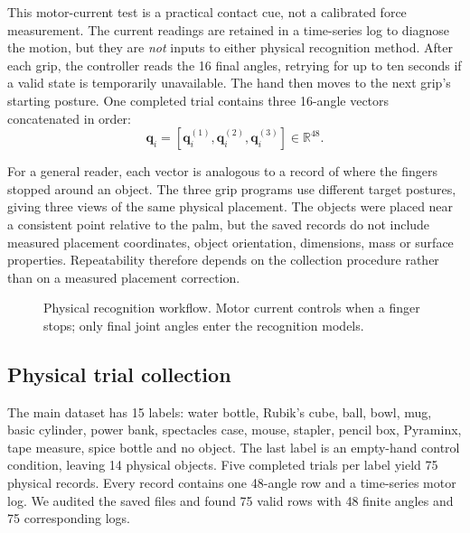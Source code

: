 \documentclass[12pt,a4paper]{article}
\begin{document}
This motor-current test is a practical contact cue, not a calibrated force measurement. The current readings are retained in a time-series log to diagnose the motion, but they are \emph{not} inputs to either physical recognition method. After each grip, the controller reads the 16 final angles, retrying for up to ten seconds if a valid state is temporarily unavailable. The hand then moves to the next grip's starting posture. One completed trial contains three 16-angle vectors concatenated in order:
\begin{equation}
\mathbf q_i = [\mathbf q_i^{(1)},\mathbf q_i^{(2)},\mathbf q_i^{(3)}]\in\mathbb{R}^{48}.
\end{equation}

For a general reader, each vector is analogous to a record of where the fingers stopped around an object. The three grip programs use different target postures, giving three views of the same physical placement. The objects were placed near a consistent point relative to the palm, but the saved records do not include measured placement coordinates, object orientation, dimensions, mass or surface properties. Repeatability therefore depends on the collection procedure rather than on a measured placement correction.

\begin{figure}[ht]
\centering
{}
\caption{Physical recognition workflow. Motor current controls when a finger stops; only final joint angles enter the recognition models.}
\label{fig:pipeline}
\end{figure}

\subsection{Physical trial collection}

The main dataset has 15 labels: water bottle, Rubik's cube, ball, bowl, mug, basic cylinder, power bank, spectacles case, mouse, stapler, pencil box, Pyraminx, tape measure, spice bottle and no object. The last label is an empty-hand control condition, leaving 14 physical objects. Five completed trials per label yield 75 physical records. Every record contains one 48-angle row and a time-series motor log. We audited the saved files and found 75 valid rows with 48 finite angles and 75 corresponding logs.
\end{document}
